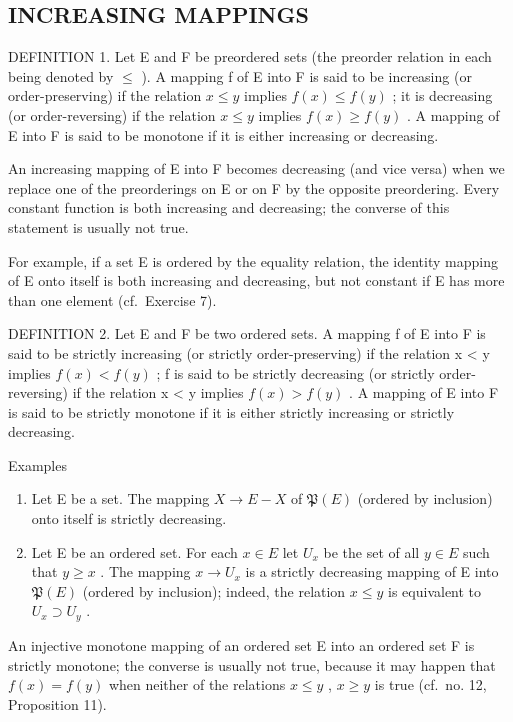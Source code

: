 \subsection{INCREASING MAPPINGS}

DEFINITION 1. Let E and F be preordered sets (the preorder relation in each being denoted by \(\leqslant\) ). A mapping f of E into F is said to be increasing (or order-preserving) if the relation \(x \leqslant y\) implies \(f(x) \leqslant f(y)\) ; it is decreasing (or order-reversing) if the relation \(x \leqslant y\) implies \(f(x) \geqslant f(y)\) . A mapping of E into F is said to be monotone if it is either increasing or decreasing.

An increasing mapping of E into F becomes decreasing (and vice versa) when we replace one of the preorderings on E or on F by the opposite preordering. Every constant function is both increasing and decreasing; the converse of this statement is usually not true.

For example, if a set E is ordered by the equality relation, the identity mapping of E onto itself is both increasing and decreasing, but not constant if E has more than one element (cf.~Exercise 7).

DEFINITION 2. Let E and F be two ordered sets. A mapping f of E into F is said to be strictly increasing (or strictly order-preserving) if the relation x \textless{} y implies \(f(x) < f(y)\) ; f is said to be strictly decreasing (or strictly order-reversing) if the relation x \textless{} y implies \(f(x) > f(y)\) . A mapping of E into F is said to be strictly monotone if it is either strictly increasing or strictly decreasing.

Examples

\begin{enumerate}
\def\labelenumi{(\arabic{enumi})}
\item
  Let E be a set. The mapping \(X \rightarrow E - X\) of \(\mathfrak{P}(E)\) (ordered by inclusion) onto itself is strictly decreasing.
\item
  Let E be an ordered set. For each \(x \in E\) let \(U_x\) be the set of all \(y \in E\) such that \(y \geqslant x\) . The mapping \(x \to U_x\) is a strictly decreasing mapping of E into \(\mathfrak{P}(E)\) (ordered by inclusion); indeed, the relation \(x \leqslant y\) is equivalent to \(U_x \supset U_y\) .
\end{enumerate}

An injective monotone mapping of an ordered set E into an ordered set F is strictly monotone; the converse is usually not true, because it may happen that \(f(x) = f(y)\) when neither of the relations \(x \leqslant y\) , \(x \geqslant y\) is true (cf.~no. 12, Proposition 11).

